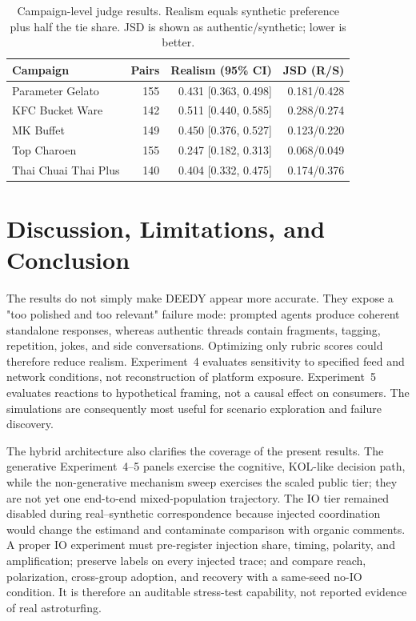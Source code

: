 \documentclass[conference]{IEEEtran}
\begin{document}
\begin{table}[t]
\caption{Campaign-level judge results. Realism equals synthetic preference plus
half the tie share. JSD is shown as authentic/synthetic; lower is better.}
\label{tab:campaign-results}
\centering
\scriptsize
\begin{tabular}{@{}lrrr@{}}
\toprule
Campaign & Pairs & Realism (95\% CI) & JSD (R/S) \\
\midrule
Parameter Gelato & 155 & 0.431 [0.363, 0.498] & 0.181/0.428 \\
KFC Bucket Ware & 142 & 0.511 [0.440, 0.585] & 0.288/0.274 \\
MK Buffet & 149 & 0.450 [0.376, 0.527] & 0.123/0.220 \\
Top Charoen & 155 & 0.247 [0.182, 0.313] & 0.068/0.049 \\
Thai Chuai Thai Plus & 140 & 0.404 [0.332, 0.475] & 0.174/0.376 \\
\bottomrule
\end{tabular}
\end{table}

\section{Discussion, Limitations, and Conclusion}

The results do not simply make DEEDY appear more accurate. They expose a
"too polished and too relevant" failure mode: prompted agents produce coherent
standalone responses, whereas authentic threads contain fragments, tagging,
repetition, jokes, and side conversations. Optimizing only rubric scores could
therefore reduce realism. Experiment~4 evaluates sensitivity to specified feed
and network conditions, not reconstruction of platform exposure. Experiment~5
evaluates reactions to hypothetical framing, not a causal effect on consumers.
The simulations are consequently most useful for scenario exploration and
failure discovery.

The hybrid architecture also clarifies the coverage of the present results.
The generative Experiment~4--5 panels exercise the cognitive, KOL-like decision
path, while the non-generative mechanism sweep exercises the scaled public
tier; they are not yet one end-to-end mixed-population trajectory. The IO tier
remained disabled during real--synthetic correspondence because injected
coordination would change the estimand and contaminate comparison with organic
comments. A proper IO experiment must pre-register injection share, timing,
polarity, and amplification; preserve labels on every injected trace; and
compare reach, polarization, cross-group adoption, and recovery with a
same-seed no-IO condition. It is therefore an auditable stress-test capability,
not reported evidence of real astroturfing.
\end{document}
